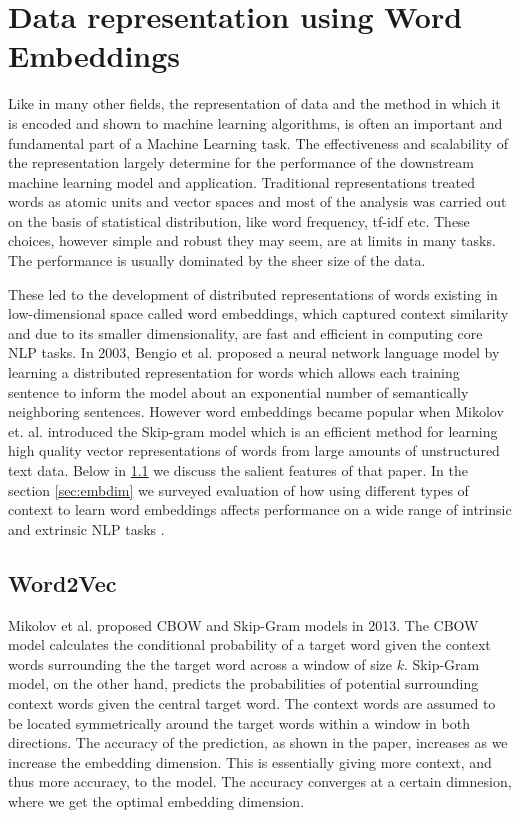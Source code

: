 \documentclass{article}
\begin{document}
\section{Data representation using Word Embeddings}
\label{sec:emb}

	Like in many other fields, the representation of data and the method in which it is encoded and shown to machine learning algorithms, is often an important and fundamental part of a Machine Learning task. The effectiveness and scalability of the representation largely determine for the performance of the downstream machine learning model and application. Traditional representations treated words as atomic units and vector spaces\cite{salton} and most of the analysis was carried out on the basis of statistical distribution\cite{jones}, like word frequency, tf-idf \cite{jonesfre} etc. These choices, however simple and robust they may seem, are at limits in many tasks. The performance is usually dominated by the sheer size of the data.
	
	These led to the development of distributed representations of words existing in low-dimensional space called word embeddings, which captured context similarity and due to its smaller dimensionality, are fast and efficient in computing core NLP tasks. In 2003, Bengio et al. \cite{benn} proposed a neural network language model by learning a distributed representation for words which allows each training sentence to inform the model about an exponential number of semantically neighboring sentences. However word embeddings became popular when Mikolov et. al. introduced the Skip-gram model \cite{mikw2v} which is an efficient method for learning high quality vector representations of words from large amounts of unstructured text data. Below in \ref{sec:w2v} we discuss the salient features of that paper. In the section \ref{sec:embdim} we surveyed evaluation of how using different types of context to learn word embeddings affects performance on a wide range of intrinsic and extrinsic NLP tasks \cite{melamud}.
	
\subsection{Word2Vec}
\label{sec:w2v}
	
	Mikolov et al. \cite{mikw2v} \cite{mikngs} proposed CBOW and Skip-Gram models in 2013. The CBOW model calculates the conditional probability of a target word given the context words surrounding the the target word across a window of size \(k\). Skip-Gram model, on the other hand, predicts the probabilities of potential surrounding context words given the central target word. The context words are assumed to be located symmetrically around the target words within a window in both directions. The accuracy of the prediction, as shown in the paper, increases as we increase the embedding dimension. This is essentially giving more context, and thus more accuracy, to the model. The accuracy converges at a certain dimnesion, where we get the optimal embedding dimension. 
	
\end{document}
